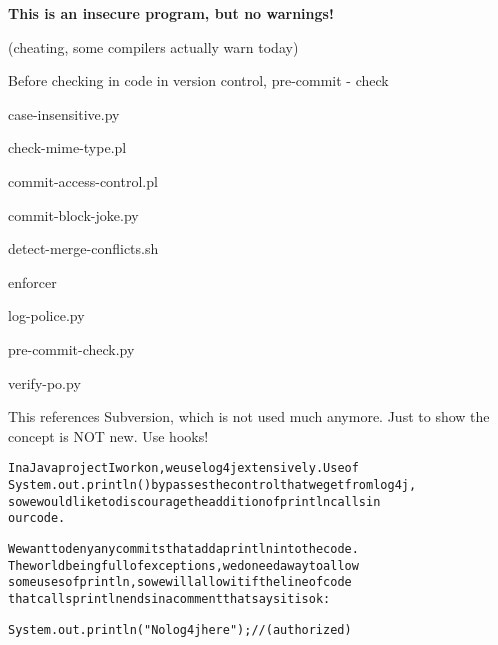 \documentclass[Screen16to9,17pt]{foils}
\begin{document}
\vskip 1cm
\centerline{\bf\large\color{security6blue}This is an insecure program, but no warnings!}

(cheating, some compilers actually warn today)


\begin{list1}
\item Before checking in code in version control,  pre-commit - check
\begin{list2}
\item case-insensitive.py
\item check-mime-type.pl
\item commit-access-control.pl
\item commit-block-joke.py
\item detect-merge-conflicts.sh
\item enforcer
\item log-police.py
\item pre-commit-check.py
\item verify-po.py
\end{list2}
\item {}
\item {}
\end{list1}

This references Subversion, which is not used much anymore. Just to show the concept is NOT new. Use hooks!


\begin{alltt}
In a Java project I work on, we use log4j extensively.  Use of
System.out.println() bypasses the control that we get from log4j,
so we would like to discourage the addition of println calls in
our code.

We want to deny any commits that add a println into the code.
The world being full of exceptions, we do need a way to allow
some uses of println, so we will allow it if the line of code
that calls println ends in a comment that says it is ok:

   System.out.println("No log4j here"); // (authorized)
\end{alltt}

{\small {}}



\end{document}
